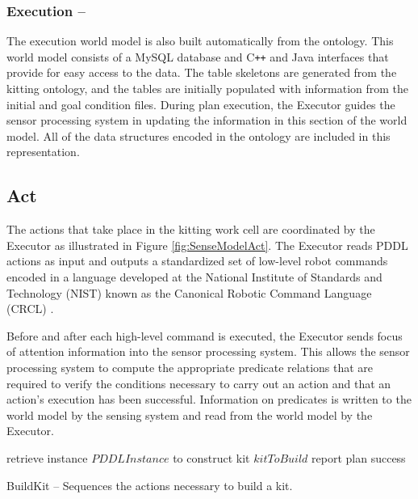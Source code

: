\subsubsection{Execution --}
The execution world model is also built automatically from the ontology. This world model consists of a MySQL database and C\texttt{++} and Java
interfaces that provide for easy access to the data. The table skeletons are generated from the kitting ontology, and the tables are initially populated
with information from the initial and goal condition files. During plan execution, the Executor guides the sensor processing system
in updating the information in 
this section of the world model. All of the data structures encoded in the ontology are included in this representation. 
%
\subsection{Act}
\label{subsection:Act}
The actions that take place in the kitting work cell are coordinated by the Executor as illustrated in Figure \ref{fig:SenseModelAct}.  The Executor
reads PDDL actions as input and outputs a standardized set of low-level robot commands encoded in a language developed at the National Institute of Standards
and Technology (NIST) known as the  Canonical Robotic Command Language (CRCL) \cite{Balakirsky2012-1}. 

Before and after each high-level command
is executed, the Executor sends focus of attention information into the sensor processing system. This allows the sensor processing system to compute
the appropriate predicate relations that are required to verify the conditions necessary to carry out an action and that an action's execution has
been successful. Information on predicates is written to the world model by the sensing system and read from the world model by the Executor.
%
\\
\begin{algorithm}[h!]

 	retrieve instance $PDDLInstance$ to construct kit $kitToBuild$\;
 	report plan success\;
\caption{{\sc BuildKit} -- Sequences the actions necessary to build a kit.}
\label{fig:buildkit}
\end{algorithm}
%